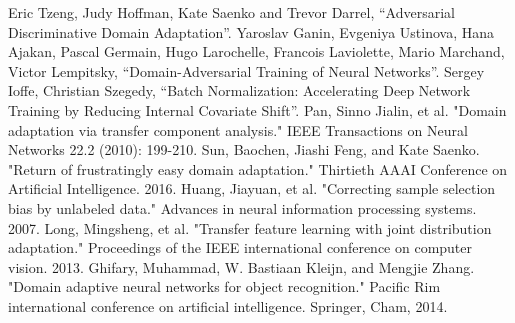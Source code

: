 \documentclass[conference]{IEEEtran}
\begin{document}
\begin{thebibliography}{00}
 Eric Tzeng, Judy Hoffman, Kate Saenko and Trevor Darrel, ``Adversarial Discriminative Domain Adaptation''.
 Yaroslav Ganin, Evgeniya Ustinova, Hana Ajakan, Pascal Germain, Hugo Larochelle, Francois Laviolette,
    Mario Marchand, Victor Lempitsky, ``Domain-Adversarial Training of Neural Networks''.
 Sergey Ioffe, Christian Szegedy, ``Batch Normalization: Accelerating Deep Network Training by Reducing Internal Covariate Shift''.
 Pan, Sinno Jialin, et al. "Domain adaptation via transfer component analysis." IEEE Transactions on Neural Networks 22.2 (2010): 199-210.
 Sun, Baochen, Jiashi Feng, and Kate Saenko. "Return of frustratingly easy domain adaptation." Thirtieth AAAI Conference on Artificial Intelligence. 2016.
 Huang, Jiayuan, et al. "Correcting sample selection bias by unlabeled data." Advances in neural information processing systems. 2007.
 Long, Mingsheng, et al. "Transfer feature learning with joint distribution adaptation." Proceedings of the IEEE international conference on computer vision. 2013. 
 Ghifary, Muhammad, W. Bastiaan Kleijn, and Mengjie Zhang. "Domain adaptive neural networks for object recognition." Pacific Rim international conference on artificial intelligence. Springer, Cham, 2014.  
\end{thebibliography}
\end{document}
